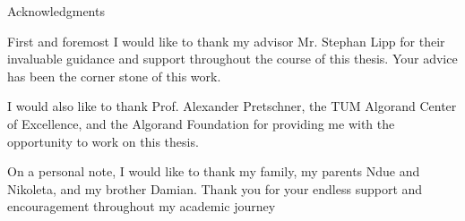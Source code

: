 \thispagestyle{empty}

\vspace*{20mm}

\begin{center}
    { Acknowledgments}
\end{center}

\vspace{10mm}

First and foremost I would like to thank my advisor Mr. Stephan Lipp for their invaluable guidance and support throughout the course of this thesis. Your advice has been the corner stone of this work.

I would also like to thank Prof. Alexander Pretschner, the TUM Algorand Center of Excellence, and the Algorand Foundation for providing me with the opportunity to work on this thesis.

On a personal note, I would like to thank my family, my parents Ndue and Nikoleta, and my brother Damian.
Thank you for your endless support and encouragement throughout my academic journey

\cleardoublepage{}
